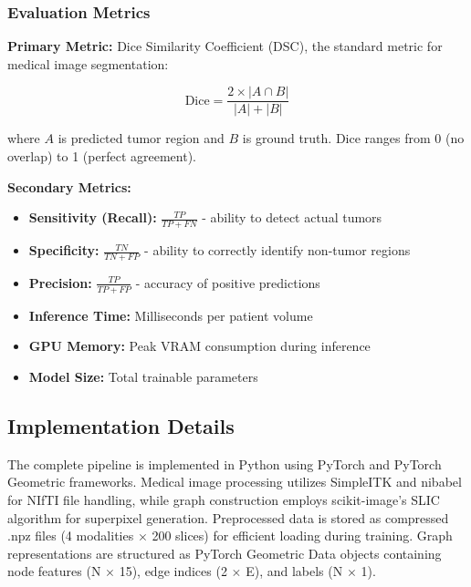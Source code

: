 \subsubsection{Evaluation Metrics}

\textbf{Primary Metric:} Dice Similarity Coefficient (DSC), the standard metric for medical image segmentation:

\begin{equation}
\text{Dice} = \frac{2 \times |A \cap B|}{|A| + |B|}
\end{equation}

where $A$ is predicted tumor region and $B$ is ground truth. Dice ranges from 0 (no overlap) to 1 (perfect agreement).

\textbf{Secondary Metrics:}
\begin{itemize}
    \item \textbf{Sensitivity (Recall):} $\frac{TP}{TP + FN}$ - ability to detect actual tumors
    \item \textbf{Specificity:} $\frac{TN}{TN + FP}$ - ability to correctly identify non-tumor regions
    \item \textbf{Precision:} $\frac{TP}{TP + FP}$ - accuracy of positive predictions
    \item \textbf{Inference Time:} Milliseconds per patient volume
    \item \textbf{GPU Memory:} Peak VRAM consumption during inference
    \item \textbf{Model Size:} Total trainable parameters
\end{itemize}


\subsection{Implementation Details}

The complete pipeline is implemented in Python using PyTorch and PyTorch Geometric frameworks. Medical image processing utilizes SimpleITK and nibabel for NIfTI file handling, while graph construction employs scikit-image's SLIC algorithm for superpixel generation. Preprocessed data is stored as compressed .npz files (4 modalities $\times$ 200 slices) for efficient loading during training. Graph representations are structured as PyTorch Geometric Data objects containing node features (N $\times$ 15), edge indices (2 $\times$ E), and labels (N $\times$ 1).

